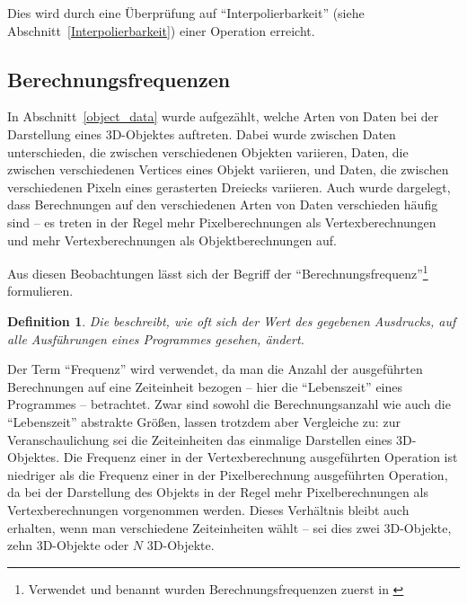 \documentclass[twoside,a4paper,fleqn,12pt]{book}
\newtheorem{defn}{Definition}
\begin{document}
Dies wird durch eine Überprüfung auf "`Interpolierbarkeit"' (siehe Abschnitt~\ref{Interpolierbarkeit}) einer Operation erreicht.


\subsection{Berechnungsfrequenzen}
\label{Berechnungsfrequenz}


In Abschnitt~\ref{object_data} wurde aufgezählt, welche Arten von Daten bei der Darstellung eines 3D-Objektes auftreten.
Dabei wurde zwischen Daten unterschieden, die zwischen verschiedenen Objekten variieren, Daten, die zwischen verschiedenen
Vertices eines Objekt variieren, und Daten, die zwischen verschiedenen Pixeln eines gerasterten Dreiecks variieren.
Auch wurde dargelegt, dass Berechnungen auf den verschiedenen Arten von Daten verschieden häufig sind --
es treten in der Regel mehr Pixelberechnungen als Vertexberechnungen und mehr Vertexberechnungen als Objektberechnungen auf.

Aus diesen Beobachtungen lässt sich der Begriff der "`Berechnungsfrequenz"'\footnote{Verwendet und benannt wurden Berechnungsfrequenzen zuerst in \cite{stanford_rtsl}}
formulieren. 

\begin{defn}
Die  beschreibt, wie oft sich der Wert des gegebenen Ausdrucks, auf alle Ausführungen eines
Programmes gesehen, ändert.
\end{defn}

Der Term "`Frequenz"' wird verwendet, da man die Anzahl der ausgeführten Berechnungen auf eine Zeiteinheit bezogen -- hier die "`Lebenszeit"' eines Programmes
-- betrachtet. Zwar sind sowohl die Berechnungsanzahl wie auch die "`Lebenszeit"' abstrakte Größen, lassen trotzdem aber
Vergleiche zu: zur Veranschaulichung sei die Zeiteinheiten das einmalige Darstellen eines 3D-Objektes.
Die Frequenz einer in der Vertexberechnung ausgeführten Operation ist niedriger als die Frequenz einer in der Pixelberechnung ausgeführten Operation, 
da bei der Darstellung des Objekts in der Regel mehr Pixelberechnungen als Vertexberechnungen vorgenommen werden.
Dieses Verhältnis bleibt auch erhalten, wenn man verschiedene Zeiteinheiten wählt -- sei dies zwei 3D-Objekte, zehn 3D-Objekte oder  $N$ 3D-Objekte.
\end{document}
